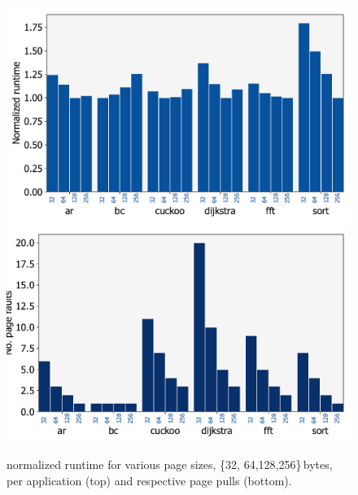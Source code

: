 \begin{figure}
	\centering
	\includegraphics[width=0.49\columnwidth]{figures/page_exec-time}
	\includegraphics[width=0.49\columnwidth]{figures/pagePulls}
	\caption{\sys normalized runtime for various page sizes, \{32, 64,128,256\}\,bytes, per application (top) and respective page pulls (bottom).}
	\label{fig:page_size}
\end{figure}

%
%

